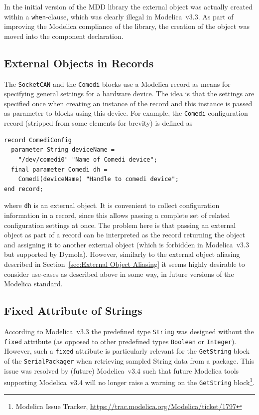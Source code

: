 \documentclass{resources/modelica}
\newcommand{\modelica}[1]{\lstinline[language=modelica]|#1|}
\begin{document}
In the initial version of the MDD library the external object was actually
created within a \modelica{when}-clause,
which was clearly illegal in Modelica~v3.3. As part of improving the Modelica
compliance of the library, the creation of the object was moved into the
component declaration.

\subsection{External Objects in Records}
\label{sec:External Objects in Records}

The \modelica{SocketCAN} and the \modelica{Comedi} blocks use a Modelica record as means
for specifying general settings for a hardware device. The idea is that the
settings are specified once when creating an instance of the record and
this instance is passed as parameter to blocks using this device. For
example, the \modelica{Comedi} configuration record (stripped from some elements for brevity) is defined
as
\begin{lstlisting}[language=modelica]
record ComediConfig
  parameter String deviceName =
    "/dev/comedi0" "Name of Comedi device";
  final parameter Comedi dh =
    Comedi(deviceName) "Handle to comedi device";
end record;
\end{lstlisting}
where \modelica{dh} is an external object. It is convenient to collect
configuration information in a record, since this allows passing a complete set
of related configuration settings at once. The problem here is that passing an
external object as part of a record can be interpreted as the record returning
the object and assigning it to another external object (which is forbidden in
Modelica~v3.3 but supported by Dymola). However, similarly to the external object aliasing described in
Section~\ref{sec:External Object Aliasing} it seems highly desirable to consider
use-cases as described above in some way, in future versions of the Modelica
standard.

\subsection{Fixed Attribute of Strings}

According to Modelica~v3.3 the predefined type \mbox{\modelica{String}} was
designed without the \modelica{fixed} attribute (as opposed to other predefined
types \modelica{Boolean} or \mbox{\modelica{Integer}).} However, such a
\modelica{fixed} attribute is particularly relevant for the \modelica{GetString}
block of the \modelica{SerialPackager} when retrieving sampled String data from
a package. This issue was resolved by (future) Modelica~v3.4 such that future
Modelica tools supporting  Modelica~v3.4 will no longer raise a warning on
the \modelica{GetString} block\footnote{Modelica Issue Tracker,
\url{https://trac.modelica.org/Modelica/ticket/1797}}.
\end{document}
